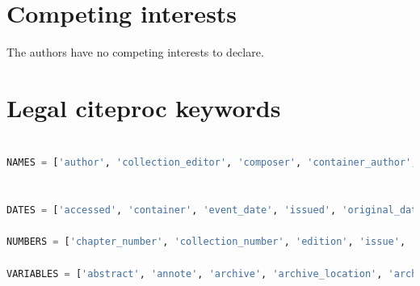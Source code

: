 \documentclass[letterpaper, twocolumn, parskip=half, fontsize=8pt, DIV=calc]{scrartcl}
\begin{document}
\section*{Competing interests}
The authors have no competing interests to declare.

\newpage
\appendix
\section{Legal citeproc keywords}
\label{app_citeproc}

\begin{lstlisting}[language=Python]

NAMES = ['author', 'collection_editor', 'composer', 'container_author', 'editor', 'editorial_director', 'illustrator', 'interviewer', 'original_author', 'recipient', 'translator']


DATES = ['accessed', 'container', 'event_date', 'issued', 'original_date', 'submitted']

NUMBERS = ['chapter_number', 'collection_number', 'edition', 'issue', 'number', 'number_of_pages', 'number_of_volumes', 'volume']

VARIABLES = ['abstract', 'annote', 'archive', 'archive_location', 'archive_place', 'authority', 'call_number', 'citation_label', 'citation_number', 'collection_title', 'container_title', 'container_title_short', 'dimensions', 'DOI', 'event', 'event_place', 'first_reference_note_number', 'genre', 'ISBN', 'ISSN', 'jurisdiction', 'keyword', 'language', 'locator', 'medium', 'note', 'original_publisher', 'original_publisher_place', 'original_title', 'page', 'page_first', 'PMCID', 'PMID', 'publisher', 'publisher_place', 'references', 'section', 'source', 'status', 'title', 'title_short', 'URL', 'version', 'year_suffix']

\end{lstlisting}

\newpage
\printglossaries



\newpage
\printbibliography
\end{document}
